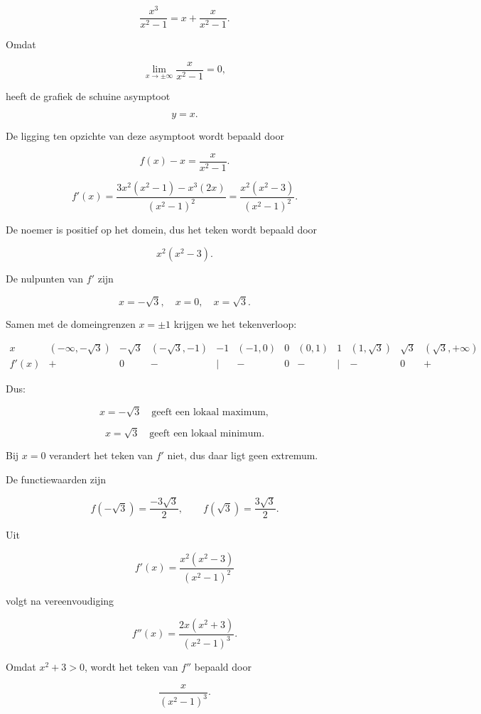 \documentclass{ximera}
\begin{document}
\[
\frac{x^3}{x^2-1}
=
x+\frac{x}{x^2-1}.
\]

Omdat

\[
\lim_{x\to\pm\infty}\frac{x}{x^2-1}=0,
\]

heeft de grafiek de schuine asymptoot

\[
\boxed{y=x.}
\]

De ligging ten opzichte van deze asymptoot wordt bepaald door

\[
f(x)-x=\frac{x}{x^2-1}.
\]


\[
f'(x)
=
\frac{3x^2(x^2-1)-x^3(2x)}{(x^2-1)^2}
=
\frac{x^2(x^2-3)}{(x^2-1)^2}.
\]

De noemer is positief op het domein, dus het teken wordt bepaald door

\[x^2(x^2-3).\]

De nulpunten van \(f'\) zijn

\[x=-\sqrt3,\quad x=0,\quad x=\sqrt3.\]

Samen met de domeingrenzen \(x=\pm1\) krijgen we het tekenverloop:

\[
\begin{array}{c|ccccccccccc}
x & (-\infty,-\sqrt3) & -\sqrt3 & (-\sqrt3,-1) & -1 &
(-1,0) & 0 & (0,1) & 1 & (1,\sqrt3) & \sqrt3 & (\sqrt3,+\infty)\\
\hline
f'(x)&+&0&-&\mid&-&0&-&\mid&-&0&+
\end{array}
\]

Dus:

\[
x=-\sqrt3 \quad\text{geeft een lokaal maximum},
\]

\[
x=\sqrt3 \quad\text{geeft een lokaal minimum}.
\]

Bij \(x=0\) verandert het teken van \(f'\) niet, dus daar ligt geen
extremum.

De functiewaarden zijn

\[
f(-\sqrt3)=\frac{-3\sqrt3}{2},
\qquad
f(\sqrt3)=\frac{3\sqrt3}{2}.
\]


Uit

\[
f'(x)=\frac{x^2(x^2-3)}{(x^2-1)^2}
\]

volgt na vereenvoudiging

\[
\boxed{f''(x)=\frac{2x(x^2+3)}{(x^2-1)^3}.}
\]

Omdat \(x^2+3>0\), wordt het teken van \(f''\) bepaald door

\[
\frac{x}{(x^2-1)^3}.
\]
\end{document}
